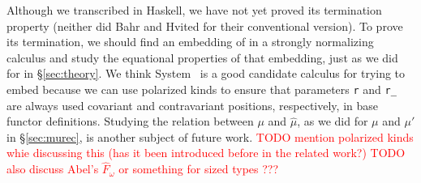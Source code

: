 \begin{figure}

\end{figure}

Although we transcribed \mphit{} in Haskell, we have not yet proved
its termination property (neither did Bahr and Hvited \cite{BahHvi12}
for their conventional version). To prove its termination, we should find
an embedding of \mphit{} in a strongly normalizing calculus and study
the equational properties of that embedding, just as we did for \msfit{}
in \S\ref{sec:theory}. We think System \Fixw\ is a good candidate calculus
for trying to embed \mphit{} because we can use polarized kinds to ensure
that parameters \lstinline{r} and \lstinline{r_} are always used covariant
and contravariant positions, respectively, in base functor definitions.
Studying the relation between $\mu$ and $\hat\mu$, as we did for
$\mu$ and $\mu'$ in \S\ref{sec:murec}, is another subject of future work.
\textcolor{red}{TODO mention polarized kinds whie discussing this
(has it been introduced before in the related work?)}
\textcolor{red}{TODO also discuss Abel's $\hat{F}_\omega$ or
	something for sized types ???}
